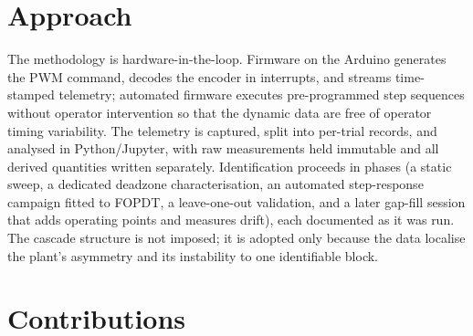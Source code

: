 \section{Approach}

The methodology is hardware-in-the-loop. Firmware on the Arduino generates the PWM command, decodes the encoder in interrupts, and streams time-stamped telemetry; automated firmware executes pre-programmed step sequences without operator intervention so that the dynamic data are free of operator timing variability. The telemetry is captured, split into per-trial records, and analysed in Python/Jupyter, with raw measurements held immutable and all derived quantities written separately. Identification proceeds in phases (a static sweep, a dedicated deadzone characterisation, an automated step-response campaign fitted to FOPDT, a leave-one-out validation, and a later gap-fill session that adds operating points and measures drift), each documented as it was run. The cascade structure is not imposed; it is adopted only because the data localise the plant's asymmetry and its instability to one identifiable block.

\section{Contributions}

